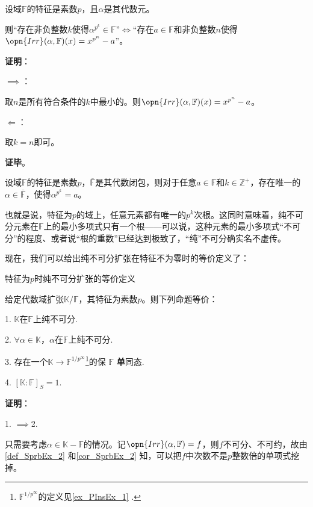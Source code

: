 \begin{lemma}{}
设域$\mathbb{F}$的特征是素数$p$，且$\alpha$是其代数元。

则“存在非负整数$k$使得$\alpha^{p^k}\in\mathbb{F}$”$\iff$“存在$a\in\mathbb{F}$和非负整数$n$使得$\opn{Irr}(\alpha, \mathbb{F})(x) = x^{p^n}-a$”。

\end{lemma}

\textbf{证明}：

$\implies$：

取$n$是所有符合条件的$k$中最小的。则$\opn{Irr}(\alpha, \mathbb{F})(x) = x^{p^n}-a$。

$\Leftarrow$：

取$k=n$即可。

\textbf{证毕}。

\begin{corollary}{}\label{cor_PInsEx_1}
设域$\mathbb{F}$的特征是素数$p$，$\overline{\mathbb{F}}$是其代数闭包，则对于任意$a\in\mathbb{F}$和$k\in\mathbb{Z}^+$，存在唯一的$\alpha\in\overline{\mathbb{F}}$，使得$\alpha^{p^k}=a$。
\end{corollary}

也就是说，特征为$p$的域上，任意元素都有唯一的$p^k$次根。这同时意味着，纯不可分元素在$\mathbb{F}$上的最小多项式只有一个根——可以说，这种元素的最小多项式“不可分”的程度、或者说“根的重数”已经达到极致了，“纯”不可分确实名不虚传。


现在，我们可以给出纯不可分扩张在特征不为零时的等价定义了：




\begin{theorem}{特征为$p$时纯不可分扩张的等价定义}\label{the_PInsEx_1}


给定代数域扩张$\mathbb{K}/\mathbb{F}$，其特征为素数$p$。则下列命题等价：

1. $\mathbb{K}$在$\mathbb{F}$上纯不可分.

2. $\forall \alpha\in\mathbb{K}$，$\alpha$在$\mathbb{F}$上纯不可分.

3. 存在一个$\mathbb{K}\to\mathbb{F}^{1/p^\infty}$\footnote{$\mathbb{F}^{1/p^\infty}$的定义见\autoref{ex_PInsEx_1} .}的保 $\mathbb{F}$ \textbf{单}同态.

4. $[\mathbb{K}:\mathbb{F}]_S=1$.


\end{theorem}

\textbf{证明}：

1. $\implies$2. 

只需要考虑$\alpha\in\mathbb{K}-\mathbb{F}$的情况。记$\opn{Irr}(\alpha, \mathbb{F})=f$，则$f$不可分、不可约，故由\autoref{def_SprbEx_2} 和\autoref{cor_SprbEx_2}  知，可以把$f$中次数不是$p$整数倍的单项式挖掉。

